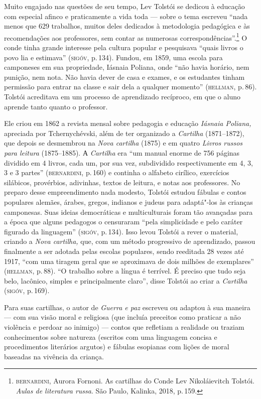 Muito engajado nas questões de seu tempo, Lev Tolstói se dedicou à
educação com especial afinco e praticamente a vida toda --- sobre o tema
escreveu ``nada menos que 629 trabalhos, muitos deles dedicados à
metodologia pedagógica e às recomendações aos professores, sem contar as
numerosas correspondências''.\footnote{\textsc{bernardini}, Aurora Fornoni. As
  cartilhas do Conde Lev Nikoláievitch Tolstói. \emph{Aulas de
  literatura russa}. São Paulo, Kalinka, 2018, p.\,159.} O conde
tinha grande interesse pela cultura popular e pesquisava ``quais livros
o povo lia e estimava'' (\textsc{sigóv}, p.\,134). Fundou, em 1859, uma escola
para camponeses em sua propriedade, Iásnaia Poliana, onde ``não
havia horário, nem punição, nem nota. Não havia dever de casa e exames,
e os estudantes tinham permissão para entrar na classe e sair dela a
qualquer momento'' (\textsc{hellman}, p.\,86). Tolstói acreditava em um processo
de aprendizado recíproco, em que o aluno aprende tanto quanto o
professor.

Ele criou em 1862 a revista mensal sobre pedagogia e educação
\emph{Iásnaia Poliana,} apreciada por Tchernychévski, além de ter
organizado a \emph{Cartilha} (1871--1872), que depois se desmembrou na
\emph{Nova cartilha} (1875) e em quatro \emph{Livros russos para
leitura} (1875--1885). А \emph{Cartilha} era ``um manual enorme
de 756 páginas dividido em 4 livros, cada um, por sua vez, subdividido
respectivamente em 4, 3, 3 e 3 partes'' (\textsc{bernardini}, p.\,160) e continha
o alfabeto cirílico, exercícios silábicos, provérbios, adivinhas, textos
de leitura, e notas aos professores. No preparo desse empreendimento
nada modesto, Tolstói estudou fábulas e contos populares alemães,
árabes, gregos, indianos e judeus para adaptá"-los às crianças
camponesas. Suas ideias democráticas e multiculturais foram tão
avançadas para a época que alguns pedagogos o censuraram ``pela
simplicidade e pelo caráter figurado da linguagem'' (\textsc{sigóv}, p.\,134).
Isso levou Tolstói a rever o material, criando a \emph{Nova cartilha,}
que, com um método progressivo de aprendizado, passou finalmente a ser
adotada pelas escolas populares, sendo reeditada 28 vezes até 1917,
``com uma tiragem geral que se aproximava de dois milhões de
exemplares'' (\textsc{hellman}, p.\,88). ``O trabalho sobre a língua é terrível. É
preciso que tudo seja belo, lacônico, simples e principalmente claro'',
disse Tolstói ao criar a \emph{Cartilha} (\textsc{sigóv}, p.\,169).

Para suas cartilhas, o autor de \emph{Guerra e paz} escreveu ou adaptou
à sua maneira --- com sua visão moral e religiosa (que incluía preceitos
como praticar a não violência e perdoar ao inimigo) --- contos que
refletiam a realidade ou traziam conhecimentos sobre natureza (escritos
com uma linguagem concisa e procedimentos literários argutos) e fábulas
esopianas com lições de moral baseadas na vivência da criança.

